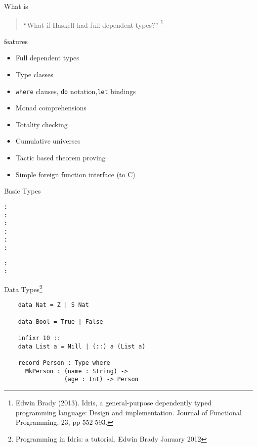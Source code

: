 \documentclass[rail]{beamer}
\title{\idris}
\subtitle{A language with dependent types}
\author{Alejandro Gómez Londoño}
\date{17th March, 2014}
\institute{EAFIT University}
\begin{document}
\begin{frame}
  \titlepage
\end{frame}

\begin{frame}{What is \idris}
  \begin{quotation}
    “What if Haskell had full dependent types?”
    \footnote[frame,1]{ Edwin Brady (2013). Idris, a general-purpose
      dependently typed programming language: Design and
      implementation. Journal of Functional Programming, 23, pp
      552-593.}
  \end{quotation}
\end{frame}

\begin{frame}{\idris features}
  \begin{itemize}
    \item Full dependent types
    \item Type classes
    \item \texttt{where} clauses, \texttt{do} notation,\texttt{let} bindings
    \item Monad comprehensions
    \item Totality checking
    \item Cumulative universes
    \item Tactic based theorem proving
    \item Simple foreign function interface (to C)
  \end{itemize}
\end{frame}

\begin{frame}[fragile]{\idris}{Basic Types}
\begin{alltt}

  {\color{red}{Z}} : {\color{blue}{Nat}}
  {\color{red}{50}} : {\color{blue}{Integer}}
  {\color{red}{1.23}} : {\color{blue}{Float}}
  {\color{red}{True}} : {\color{blue}{Bool}}
  {\color{red}{'a'}} : {\color{blue}{Char}}
  {\color{red}{"foo"}} : {\color{blue}{String}}

  {\color{red}{[1,2,3]}} : {\color{blue}{List Integer}}
  {\color{red}{[1,2,3]}} : {\color{blue}{Vect 3 Integer}}
\end{alltt}
\end{frame}

\begin{frame}[fragile]{\idris}
  {Data Types\footnote[frame,1]
    {Programming in Idris: a tutorial, Edwin Brady January 2012}}
  \begin{lstlisting}
    data Nat = Z | S Nat

    data Bool = True | False

    infixr 10 ::
    data List a = Nill | (::) a (List a)

    record Person : Type where
      MkPerson : (name : String) ->
                 (age : Int) -> Person
  \end{lstlisting}
\end{frame}
\end{document}

